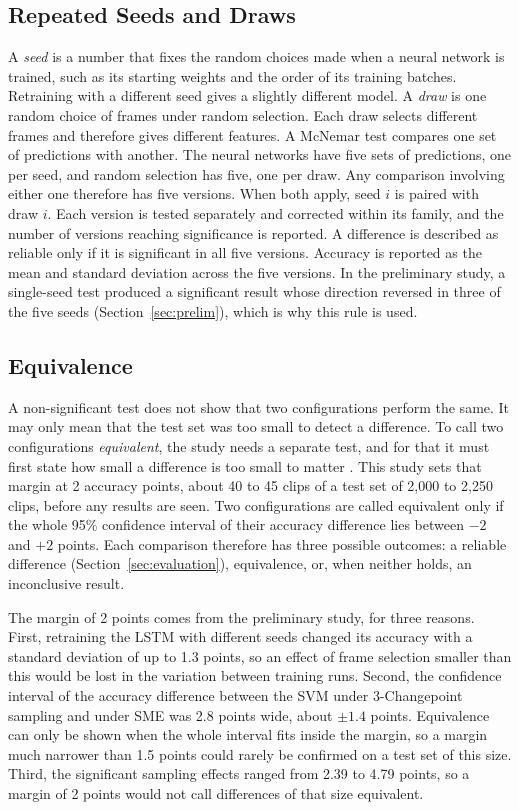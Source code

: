 \subsection{Repeated Seeds and Draws}

A \emph{seed} is a number that fixes the random choices made when a neural network is trained, such as its starting weights and the order of its training batches. Retraining with a different seed gives a slightly different model. A \emph{draw} is one random choice of frames under random selection. Each draw selects different frames and therefore gives different features. A McNemar test compares one set of predictions with another. The neural networks have five sets of predictions, one per seed, and random selection has five, one per draw. Any comparison involving either one therefore has five versions. When both apply, seed $i$ is paired with draw $i$. Each version is tested separately and corrected within its family, and the number of versions reaching significance is reported. A difference is described as reliable only if it is significant in all five versions. Accuracy is reported as the mean and standard deviation across the five versions. In the preliminary study, a single-seed test produced a significant result whose direction reversed in three of the five seeds (Section~\ref{sec:prelim}), which is why this rule is used.

\subsection{Equivalence}

A non-significant test does not show that two configurations perform the same. It may only mean that the test set was too small to detect a difference. To call two configurations \emph{equivalent}, the study needs a separate test, and for that it must first state how small a difference is too small to matter \cite{lakens2017}. This study sets that margin at 2 accuracy points, about 40 to 45 clips of a test set of 2,000 to 2,250 clips, before any results are seen. Two configurations are called equivalent only if the whole 95\% confidence interval of their accuracy difference lies between $-2$ and $+2$ points. Each comparison therefore has three possible outcomes: a reliable difference (Section~\ref{sec:evaluation}), equivalence, or, when neither holds, an inconclusive result.

The margin of 2 points comes from the preliminary study, for three reasons. First, retraining the LSTM with different seeds changed its accuracy with a standard deviation of up to 1.3 points, so an effect of frame selection smaller than this would be lost in the variation between training runs. Second, the confidence interval of the accuracy difference between the SVM under 3-Changepoint sampling and under SME was 2.8 points wide, about $\pm 1.4$ points. Equivalence can only be shown when the whole interval fits inside the margin, so a margin much narrower than 1.5 points could rarely be confirmed on a test set of this size. Third, the significant sampling effects ranged from 2.39 to 4.79 points, so a margin of 2 points would not call differences of that size equivalent.


